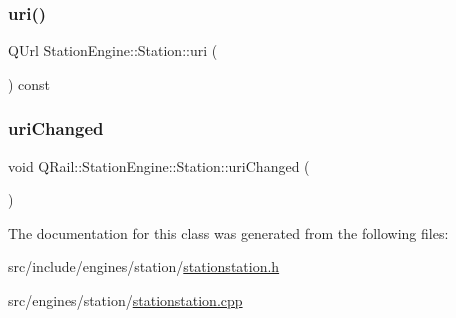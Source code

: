 \mbox{\label{classQRail_1_1StationEngine_1_1Station_a7ccf866501e2f547935c152b67d192f6}} 
\subsubsection{\texorpdfstring{uri()}{uri()}}
{\footnotesize\ttfamily Q\+Url Station\+Engine\+::\+Station\+::uri (\begin{DoxyParamCaption}{ }\end{DoxyParamCaption}) const}

\mbox{\label{classQRail_1_1StationEngine_1_1Station_a25743385c35feaac93b667a9a828bde8}} 
\subsubsection{\texorpdfstring{uriChanged}{uriChanged}}
{\footnotesize\ttfamily void Q\+Rail\+::\+Station\+Engine\+::\+Station\+::uri\+Changed (\begin{DoxyParamCaption}{ }\end{DoxyParamCaption})\hspace{0.3cm}{\ttfamily [signal]}}



The documentation for this class was generated from the following files\+:\begin{DoxyCompactItemize}
\item 
src/include/engines/station/\mbox{\hyperlink{stationstation_8h}{stationstation.\+h}}\item 
src/engines/station/\mbox{\hyperlink{stationstation_8cpp}{stationstation.\+cpp}}\end{DoxyCompactItemize}
